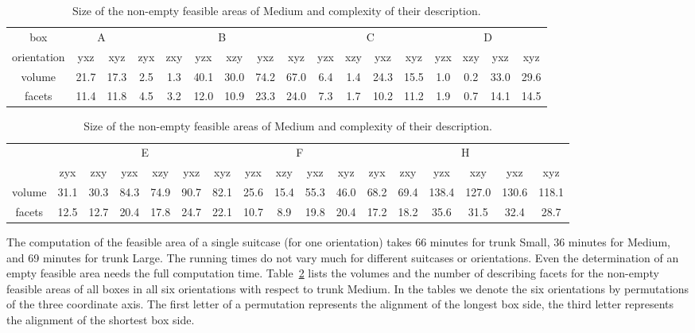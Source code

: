 \documentclass{article}
\newcommand{\TSmall}{{\sc Small}}
\newcommand{\TMedium}{{\sc Medium}}
\newcommand{\TLarge}{{\sc Large}}
\begin{document}
\begin{table}[b]
\small
\center
\begin{tabular}{|c|cc|cccccc|cccc|cccc|}
\hline
box
& \multicolumn{2}{|c|}{A}
& \multicolumn{6}{|c|}{B}
& \multicolumn{4}{|c|}{C}
& \multicolumn{4}{|c|}{D} \\
orientation & yxz & xyz & 
zyx & zxy & yzx & xzy & yxz & xyz &
yzx & xzy & yxz & xyz &
yzx & xzy & yxz & xyz \\
\hline
volume  & 21.7 & 17.3 & 2.5 & 1.3 & 40.1 & 30.0 & 74.2 & 67.0 & 6.4 & 1.4 & 24.3 & 15.5 & 1.0 & 0.2 & 33.0 & 29.6 \\
facets & 11.4 & 11.8 & 4.5 & 3.2 & 12.0 & 10.9 & 23.3 & 24.0 & 7.3 & 1.7 & 10.2 & 11.2 & 1.9 & 0.7 & 14.1 & 14.5 \\
\hline
\end{tabular}
\vspace{3mm}
\begin{tabular}{|c|cccccc|cccc|cccccc|}
\hline
& \multicolumn{6}{|c|}{E}
& \multicolumn{4}{|c|}{F}
& \multicolumn{6}{|c|}{H} \\
& zyx & zxy & yzx & xzy & yxz & xyz &
yzx & xzy & yxz & xyz &
zyx & zxy & yzx & xzy & yxz & xyz \\
\hline
volume  & 31.1 & 30.3 & 84.3 & 74.9 & 90.7 & 82.1 & 25.6 & 15.4 & 55.3 & 46.0 & 68.2 & 69.4 & 138.4 & 127.0 & 130.6 & 118.1 \\
facets  & 12.5 & 12.7 & 20.4 & 17.8 & 24.7 & 22.1 & 10.7 & 8.9 & 19.8 & 20.4 & 17.2 & 18.2 & 35.6 & 31.5 & 32.4 & 28.7 \\
\hline
\end{tabular}
\vspace{0.5mm}
\caption{\label{tab:feasibleAreas} 
Size of the non-empty feasible areas of {\TMedium} and complexity of
their description. }
\end{table}

The computation of the feasible area of a single suitcase (for one
orientation) takes 66 minutes for trunk {\TSmall}, 36 minutes for
{\TMedium}, and 69 minutes for trunk {\TLarge}. The running times do
not vary much for different suitcases or orientations. Even the
determination of an empty feasible area needs the full computation
time. Table~\ref{tab:feasibleAreas} lists the volumes and the number
of describing facets for the non-empty feasible areas of all boxes in
all six orientations with respect to trunk {\TMedium}. In the tables
we denote the six orientations by permutations of the three coordinate
axis. The first letter of a permutation represents the alignment of
the longest box side, the third letter represents the alignment of
the shortest box side.
\end{document}
